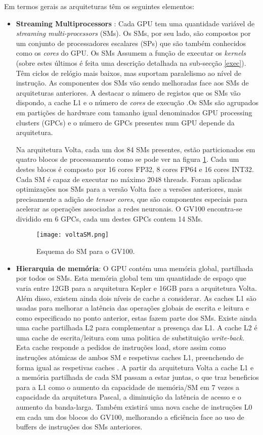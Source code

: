 Em termos gerais as arquiteturas têm os seguintes elementos:
\begin{itemize}
\item \textbf{Streaming Multiprocessors} : Cada GPU tem uma quantidade variável de \textit{streaming multi-processors} (SMs). Os SMs, por seu lado, são compostos por um conjunto de processadores escalares (SPs) que são também conhecidos como os \textit{cores} do GPU. Os SMs Assumem a função de executar os \textit{kernels} (sobre estes últimos é feita uma descrição detalhada na sub-secção \ref{exec}). Têm ciclos de relógio mais baixos, mas suportam paralelismo ao nível de instrução. As componentes dos SMs vão sendo melhoradas face aos SMs de arquiteturas anteriores. A destacar o número de registos que os SMs vão dispondo, a cache L1 e o número de \textit{cores} de execução \cite{wilt_2013}.Os SMs são agrupados em partições de hardware com tamanho igual denominados GPU processing clusters (GPCs) e o número de GPCs presentes num GPU depende da arquitetura.  \par
Na arquitetura Volta, cada um dos 84 SMs presentes, estão particionados em quatro blocos de processamento como se pode ver na figura \ref{voltaSM}. Cada um destes blocos é composto por 16 cores FP32, 8 cores FP64 e 16 cores INT32. Cada SM é capaz de executar no máximo 2048 threads. Foram aplicadas optimizações nos SMs para a versão Volta face a versões anteriores, mais precisamente a adição de \textit{tensor cores}, que são componentes especiais para acelerar as operações associadas a redes neuronais. O GV100 encontra-se dividido em 6 GPCs, cada um destes GPCs contem 14 SMs.
 \begin{figure}[ht]
  \centering
    {\texttt{[image: voltaSM.png]}}
  \caption{Esquema do SM para o GV100\cite{voltaArch}.}
  \label{voltaSM}
 \end{figure}
%
\item \textbf{Hierarquia de memória}: O GPU contém uma memória global, partilhada por todos os SMs. Esta memória global tem um quantidade de espaço que varia entre 12GB para a arquitetura Kepler e 16GB para a arquitetura Volta.  Além disso, existem ainda dois níveis de cache a considerar. As caches L1 são usadas para melhorar a latência das operações globais de escrita e leitura e como especificado no ponto anterior, estas fazem parte dos SMs. Existe ainda uma cache partilhada L2 para complementar a presença das L1. A cache L2 é uma cache de escrita/leitura com uma politica de substituição \textit{write-back}. Esta cache responde a pedidos de instruções load, store assim como instruções atómicas de ambos SM e respetivas caches L1, preenchendo de forma igual as respetivas caches \cite{nickolls2010gpu}. A partir da arquitetura Volta a cache L1 e a memória partilhada de cada SM passam a estar juntas, o que traz beneficios para a L1 como o aumento da capacidade de memória/SM em 7 vezes a capacidade da arquitetura Pascal, a diminuição da latência de acesso e o aumento da banda-larga\cite{voltaArch}.  Também existirá uma nova cache de instruções L0 em cada um dos blocos do GV100, melhorando a eficiência face ao uso de buffers de instruções dos SMs anteriores. 

\end{itemize}
